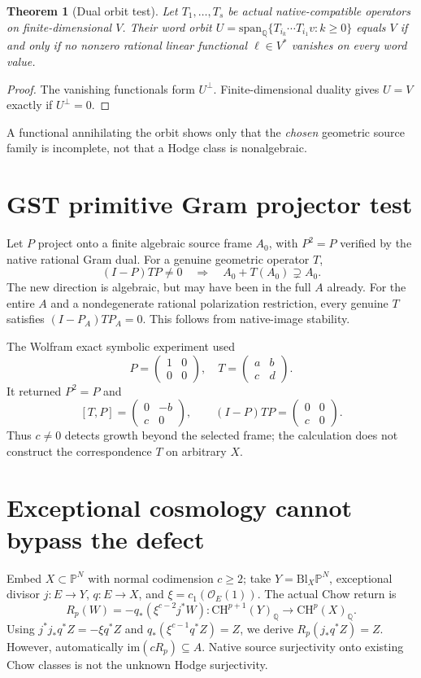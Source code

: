 \documentclass[11pt]{article}
\newcommand{\Q}{\mathbb Q}
\newcommand{\CH}{\mathrm{CH}}
\newcommand{\im}{\mathrm{im}}
\newtheorem{theorem}{Theorem}
\begin{document}
\begin{theorem}[Dual orbit test]
Let $T_1,\ldots,T_s$ be actual native-compatible
operators on finite-dimensional $V$. Their word orbit
$U=\mathrm{span}_{\Q}\{T_{i_k}\cdots T_{i_1}v:k\ge0\}$
equals $V$ if and only if no nonzero rational linear
functional $\ell\in V^*$ vanishes on every word value.
\end{theorem}
\begin{proof}
The vanishing functionals form $U^\perp$.
Finite-dimensional duality gives $U=V$ exactly if
$U^\perp=0$.
\end{proof}
A functional annihilating the orbit shows only that
the \emph{chosen} geometric source family is incomplete,
not that a Hodge class is nonalgebraic.

\section{GST primitive Gram projector test}
Let $P$ project onto a finite algebraic source frame
$A_0$, with $P^2=P$ verified by the native rational
Gram dual. For a genuine geometric operator $T$,
\[
 (I-P)TP\ne0 \quad\Longrightarrow\quad
 A_0+T(A_0)\supsetneq A_0 .
\]
The new direction is algebraic, but may have been in
the full $A$ already.
For the entire $A$ and a nondegenerate rational
polarization restriction, every genuine $T$ satisfies
$(I-P_A)TP_A=0$. This follows from native-image stability.

The Wolfram exact symbolic experiment used
\[
 P=\begin{pmatrix}1&0\\0&0\end{pmatrix},\quad
 T=\begin{pmatrix}a&b\\c&d\end{pmatrix}.
\]
It returned $P^2=P$ and
\[
 [T,P]=\begin{pmatrix}0&-b\\c&0\end{pmatrix},
 \qquad
 (I-P)TP=\begin{pmatrix}0&0\\c&0\end{pmatrix}.
\]
Thus $c\ne0$ detects growth beyond the selected
frame; the calculation does not construct the
correspondence $T$ on arbitrary $X$.

\section{Exceptional cosmology cannot bypass the defect}
Embed $X\subset\mathbb P^N$ with normal codimension
$c\ge2$; take $Y=\mathrm{Bl}_X\mathbb P^N$,
exceptional divisor $j:E\to Y$, $q:E\to X$,
and $\xi=c_1(\mathcal O_E(1))$.
The actual Chow return is
\[
 R_p(W)=-q_*(\xi^{c-2}j^*W)
 :\CH^{p+1}(Y)_{\Q}\to\CH^p(X)_{\Q}.
\]
Using $j^*j_*q^*Z=-\xi q^*Z$
and $q_*(\xi^{c-1}q^*Z)=Z$,
we derive $R_p(j_*q^*Z)=Z$.
However, automatically
$\im(cR_p)\subseteq A$. Native source
surjectivity onto existing Chow classes is
not the unknown Hodge surjectivity.
\end{document}
